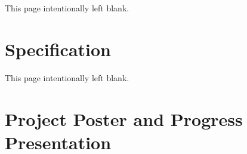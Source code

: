 \appendix
{}
This page intentionally left blank.

\chapter{Specification}
\newpage
This page intentionally left blank.

\chapter{Project Poster and Progress Presentation}
